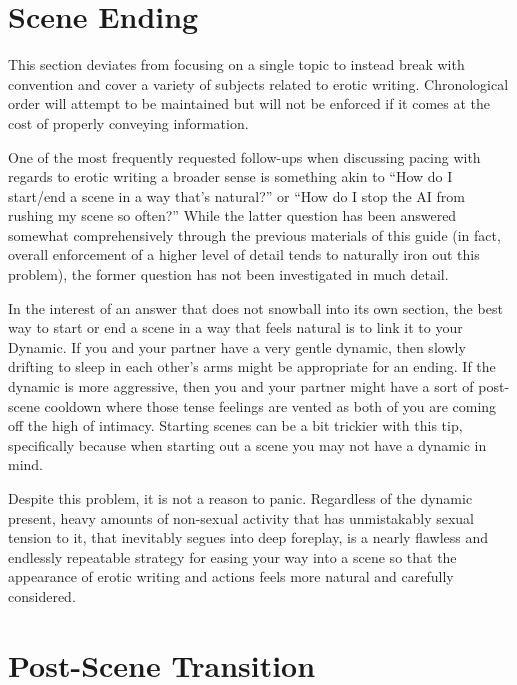 \documentclass[Source-main.tex]{subfiles}
\begin{document}
\label{chap:tips}

\section{Scene Ending}

This section deviates from focusing on a single topic to instead break with convention and cover a variety of subjects related to erotic writing.
Chronological order will attempt to be maintained but will not be enforced if it comes at the cost of properly conveying information.

One of the most frequently requested follow-ups when discussing pacing with regards to erotic writing a broader sense is something akin to “How do I start/end a scene in a way that’s natural?” or “How do I stop the AI from rushing my scene so often?” While the latter question has been answered somewhat comprehensively through the previous materials of this guide (in fact, overall enforcement of a higher level of detail tends to naturally iron out this problem), the former question has not been investigated in much detail.

In the interest of an answer that does not snowball into its own section, the best way to start or end a scene in a way that feels natural is to link it to your Dynamic.
If you and your partner have a very gentle dynamic, then slowly drifting to sleep in each other’s arms might be appropriate for an ending.
If the dynamic is more aggressive, then you and your partner might have a sort of post-scene cooldown where those tense feelings are vented as both of you are coming off the high of intimacy.
Starting scenes can be a bit trickier with this tip, specifically because when starting out a scene you may not have a dynamic in mind.

Despite this problem, it is not a reason to panic.
Regardless of the dynamic present, heavy amounts of non-sexual activity that has unmistakably sexual tension to it, that inevitably segues into deep foreplay, is a nearly flawless and endlessly repeatable strategy for easing your way into a scene so that the appearance of erotic writing and actions feels more natural and carefully considered.

\section{Post-Scene Transition}
\label{subsec:p-stransition}
\end{document}
